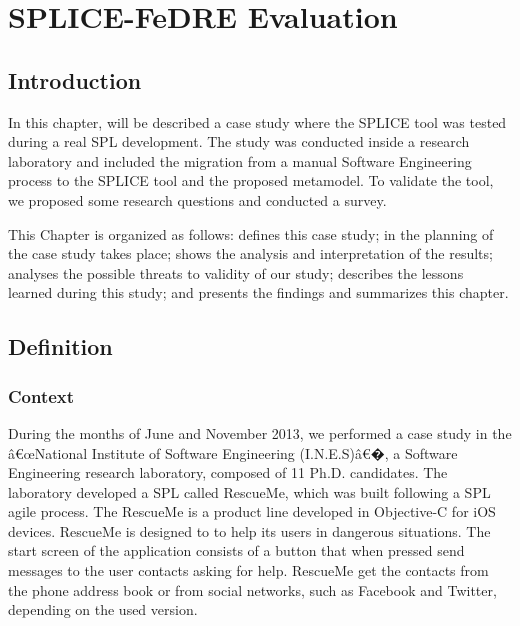\chapter{SPLICE-FeDRE Evaluation}
\label{ch:caseStudy}

\section{ Introduction }
\label{sc:experimentIntroduction}

In this chapter, will be described a case study where the \ac{SPLICE} tool was tested during a real \ac{SPL} development. The study was conducted inside a research laboratory and included the migration from a manual Software Engineering process to the \ac{SPLICE} tool and the proposed metamodel. To validate the tool, we proposed some research questions and conducted a survey. 

This Chapter is organized as follows:  defines this case study; in  the planning of the case study takes place;  shows the analysis and interpretation of the results;  analyses the possible threats  to  validity of our study;  describes the lessons learned during this study; and  presents the findings and summarizes this chapter.

\section{ Definition }
\label{sc:definition}

\subsection{Context}
During the months of June and November 2013, we performed a case study in the â€œNational Institute of Software Engineering (I.N.E.S)â€�, a Software Engineering research laboratory, composed of 11 Ph.D. candidates. The laboratory developed a \ac{SPL} called RescueMe, which was built following a \ac{SPL} agile process. 
The RescueMe is a product line developed in Objective-C for iOS devices. RescueMe is designed to to help its users in dangerous situations. The start screen of the application consists of a button that when pressed send messages to the user contacts asking for help. RescueMe get the contacts from the phone address book or from social networks, such as Facebook and Twitter, depending on the used version.

